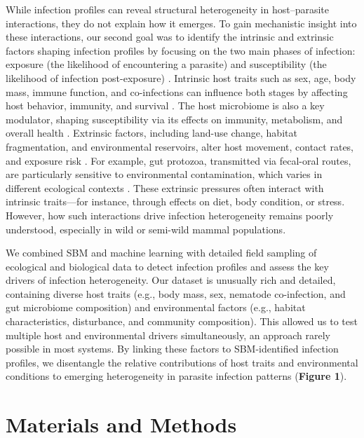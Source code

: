 \documentclass[oneside, a4paper, onecolumn, 11pt]{article}
\begin{document}
While infection profiles can reveal structural heterogeneity in host–parasite interactions, they do not explain how it emerges. To gain mechanistic insight into these interactions, our second goal was to identify the intrinsic and extrinsic factors shaping infection profiles by focusing on the two main phases of infection: exposure (the likelihood of encountering a parasite) and susceptibility (the likelihood of infection post-exposure) \citep{Poulin2007-sl, Johnson2014-vf, Sweeny2022-dm}. Intrinsic host traits such as sex, age, body mass, immune function, and co-infections can influence both stages by affecting host behavior, immunity, and survival \citep{Ezenwa2016-em, Cattadori2008-jo, Mabbott2018-wb}. The host microbiome is also a key modulator, shaping susceptibility via its effects on immunity, metabolism, and overall health \citep{Bernardo-Cravo2020-yr, Gould2018-kj}. Extrinsic factors, including land-use change, habitat fragmentation, and environmental reservoirs, alter host movement, contact rates, and exposure risk \citep{Gajewski2024-wb, Cable2017-xe, Begon2002-or, Gottdenker2014-by}. For example, gut protozoa, transmitted via fecal-oral routes, are particularly sensitive to environmental contamination, which varies in different ecological contexts \citep{Sulaiman2025-ss, Dumetre2012-ds}. These extrinsic pressures often interact with intrinsic traits---for instance, through effects on diet, body condition, or stress. However, how such interactions drive infection heterogeneity remains poorly understood, especially in wild or semi-wild mammal populations.

We combined SBM and machine learning with detailed field sampling of ecological and biological data to detect infection profiles and assess the key drivers of infection heterogeneity. Our dataset is unusually rich and detailed, containing diverse host traits (e.g., body mass, sex, nematode co-infection, and gut microbiome composition) and environmental factors (e.g., habitat characteristics, disturbance, and community composition). This allowed us to test multiple host and environmental drivers simultaneously, an approach rarely possible in most systems. By linking these factors to SBM-identified infection profiles, we disentangle the relative contributions of host traits and environmental conditions to emerging heterogeneity in parasite infection patterns (\textbf{Figure 1}).

\section*{Materials and Methods}
\end{document}
